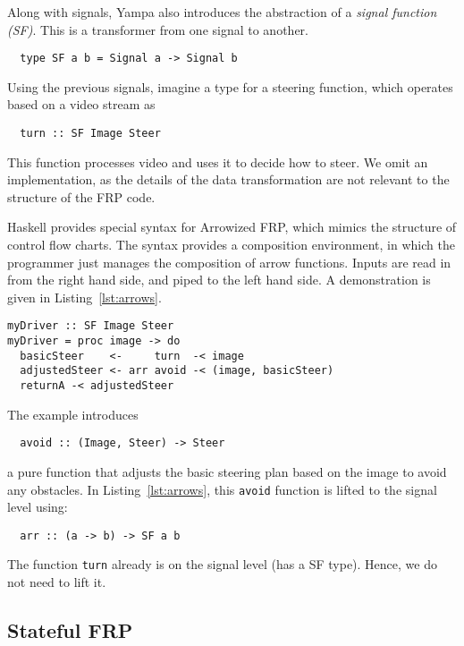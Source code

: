Along with signals, Yampa also introduces the abstraction of a \textit{signal function (SF)}.
This is a transformer from one signal to another.

\begin{lstlisting}
  type SF a b = Signal a -> Signal b
\end{lstlisting}

\noindent Using the previous signals, imagine a type for a steering function, which operates based on a video stream as

\begin{lstlisting}
  turn :: SF Image Steer
\end{lstlisting}

\noindent This function processes video and uses it to decide how to steer.
We omit an implementation, as the details of the data transformation are not relevant to the structure of the FRP code.

Haskell provides special syntax for Arrowized FRP, which mimics the structure of control flow charts.
The syntax provides a composition environment, in which the programmer just manages the composition of arrow functions.
Inputs are read in from the right hand side, and piped to the left hand side.
A demonstration is given in Listing~\ref{lst:arrows}.

\begin{lstlisting}[float,floatplacement=h!,caption=Basic Arrowized FRP syntax,label=lst:arrows]
myDriver :: SF Image Steer
myDriver = proc image -> do
  basicSteer    <-     turn  -< image
  adjustedSteer <- arr avoid -< (image, basicSteer)
  returnA -< adjustedSteer
\end{lstlisting}

The example introduces 
%
\begin{lstlisting}
  avoid :: (Image, Steer) -> Steer
\end{lstlisting}
%
a pure function that adjusts the basic steering plan based on the image to avoid any obstacles.
In Listing~\ref{lst:arrows}, this \texttt{avoid} function is lifted to the signal level using:
%
\begin{lstlisting}
  arr :: (a -> b) -> SF a b
\end{lstlisting}
%
The function \texttt{turn} already is on the signal level (has a SF type). Hence, we do not need to lift it.

\subsection{Stateful FRP}

